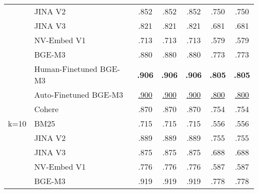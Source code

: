 \begin{table}[!h]
\begin{tabular}{@{}clccccc@{}}
      & JINA V2                & .852                     & .852                           & .852                         & .750                      & .750                            \\
      & JINA V3                & .821                     & .821                           & .821                         & .681                      & .681                            \\
      & NV-Embed V1            & .713                     & .713                           & .713                         & .579                      & .579                            \\
      & BGE-M3                 & .880                     & .880                           & .880                         & .773                      & .773                            \\
      & Human-Finetuned BGE-M3 & \textbf{.906}            & \textbf{.906}                  & \textbf{.906}                & \textbf{.805}             & \textbf{.805}                   \\
      & Auto-Finetuned BGE-M3  & \underline{.900}               & \underline{.900}                     & \underline{.900}                   & \underline{.800}                & \underline{.800}                      \\
      & Cohere                 & .870                     & .870                           & .870                         & .754                      & .754                            \\ \midrule
k=10  & BM25                   & .715                     & .715                           & .715                         & .556                      & .556                            \\
      & JINA V2                & .889                     & .889                           & .889                         & .755                      & .755                            \\
      & JINA V3                & .875                     & .875                           & .875                         & .688                      & .688                            \\
      & NV-Embed V1            & .776                     & .776                           & .776                         & .587                      & .587                            \\
      & BGE-M3                 & .919                     & .919                           & .919                         & .778                      & .778                            \\

\end{tabular}
\end{table}
